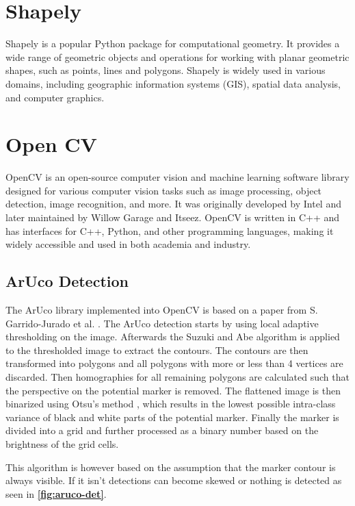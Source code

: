 \documentclass[10pt]{book}
\newcommand{\figureref}[1]{\textbf{\autoref{#1}}}
\begin{document}
\section{Shapely}

Shapely is a popular Python package for computational geometry. It provides a wide range of geometric objects and operations for working with planar geometric shapes, such as points, lines and polygons. Shapely is widely used in various domains, including geographic information systems (GIS), spatial data analysis, and computer graphics.

\section{Open CV}

\ac{OpenCV} is an open-source computer vision and machine learning software library designed for various computer vision tasks such as image processing, object detection, image recognition, and more. It was originally developed by Intel and later maintained by Willow Garage and Itseez. \ac{OpenCV} is written in C++ and has interfaces for C++, Python, and other programming languages, making it widely accessible and used in both academia and industry.

\subsection{ArUco Detection}

The \ac{ArUco} library implemented into \ac{OpenCV} is based on a paper from S. Garrido-Jurado et al. \cite{garrido2014automatic}. The \ac{ArUco} detection starts by using local adaptive thresholding on the image. Afterwards the Suzuki
and Abe algorithm \cite{SUZUKI198532} is applied to the thresholded image to extract the contours. The contours are then transformed into polygons \cite{douglas1973algorithms} and all polygons with more or less than 4 vertices are discarded. Then homographies for all remaining polygons are calculated such that the perspective on the potential marker is removed. The flattened image is then binarized using Otsu's method \cite{4310076}, which results in the lowest possible intra-class variance of black and white parts of the potential marker. Finally the marker is divided into a grid and further processed as a binary number based on the brightness of the grid cells.

This algorithm is however based on the assumption that the marker contour is always visible. If it isn't detections can become skewed or nothing is detected as seen in \figureref{fig:aruco-det}.
\end{document}
